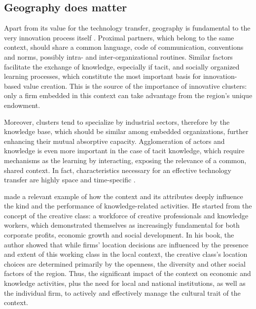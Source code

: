 \subsection{Geography does matter}

Apart from its value for the technology transfer, geography is fundamental to the very innovation process itself \citep{Asheim2009}. Proximal partners, which belong to the same context, should share a common language, code of communication, conventions and norms, possibly intra- and inter-organizational routines. Similar factors facilitate the exchange of knowledge, especially if tacit, and socially organized learning processes, which constitute the most important basis for innovation-based value creation. This is the source of the importance of innovative clusters: only a firm embedded in this context can take advantage from the region's unique endowment. 

Moreover, clusters tend to specialize by industrial sectors, therefore by the knowledge base, which should be similar among embedded organizations, further enhancing their mutual absorptive capacity. Agglomeration of actors and knowledge is even more important in the case of tacit knowledge, which require mechanisms as the learning by interacting, exposing the relevance of a common, shared context. In fact, characteristics necessary for an effective technology transfer are highly space and time-specific \citep{Asheim2009}.

\citet{Florida2002} made a relevant example of how the context and its attributes deeply influence the kind and the performance of knowledge-related activities. He started from the concept of the creative class: a workforce of creative professionals and knowledge workers, which demonstrated themselves as increasingly fundamental for both corporate profits, economic growth and social development. In his book, the author showed that while firms' location decisions are influenced by the presence and extent of this working class in the local context, the creative class's location choices are determined primarily by the openness, the diversity and other social factors of the region. Thus, the significant impact of the context on economic and knowledge activities, plus the need for local and national institutions, as well as the individual firm, to actively and effectively manage the cultural trait of the context. 

